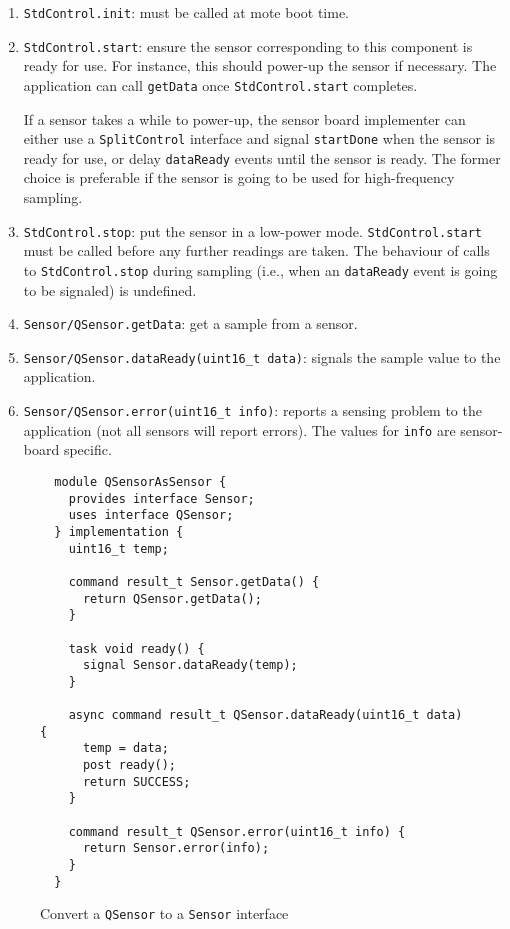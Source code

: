 \documentclass{article}
\newcommand{\code}[1]{{\tt #1}}
\begin{document}
\begin{enumerate}
\item \code{StdControl.init}: must be called at mote boot time.

\item \code{StdControl.start}: ensure the sensor corresponding to this
component is ready for use. For instance, this should power-up the sensor
if necessary. The application can call \code{getData} once 
\code{StdControl.start} completes.

If a sensor takes a while to power-up, the sensor board implementer can
either use a \code{SplitControl} interface and signal \code{startDone} when
the sensor is ready for use, or delay \code{dataReady} events until the
sensor is ready. The former choice is preferable if the sensor is going to
be used for high-frequency sampling.

\item \code{StdControl.stop}: put the sensor in a low-power mode. 
\code{StdControl.start} must be called before any further readings 
are taken. The behaviour of calls to \code{StdControl.stop} during
sampling (i.e., when an \code{dataReady} event is going to be
signaled) is undefined.

\item \code{Sensor/QSensor.getData}: get a sample from a sensor. 

\item \code{Sensor/QSensor.dataReady(uint16\_t data)}: signals the
sample value to the application.

\item \code{Sensor/QSensor.error(uint16\_t info)}: reports a sensing 
problem to the application (not all sensors will report errors). The
values for \code{info} are sensor-board specific.

\end{enumerate}

\begin{figure}
\begin{verbatim}
  module QSensorAsSensor {
    provides interface Sensor;
    uses interface QSensor;
  } implementation {
    uint16_t temp;

    command result_t Sensor.getData() {
      return QSensor.getData();
    }

    task void ready() {
      signal Sensor.dataReady(temp);
    }

    async command result_t QSensor.dataReady(uint16_t data) {
      temp = data;
      post ready();
      return SUCCESS;
    }

    command result_t QSensor.error(uint16_t info) {
      return Sensor.error(info);
    }
  }
\end{verbatim}
\caption{Convert a \code{QSensor} to a \code{Sensor} interface}
\label{fig:easyfast}
\end{figure}
\end{document}

